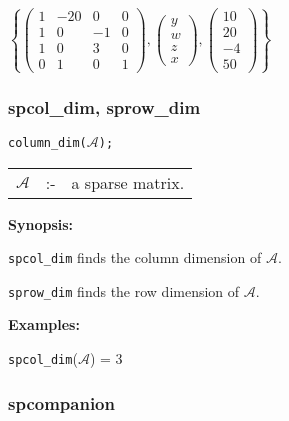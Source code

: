 \vspace*{0.1in}

\begin{flushleft}
\hspace*{0.175in}
\begin{math}  
\left\{ \left( \begin{array}{cccc} 1 & -20 & 0 & 0 \\ 1 & 0 & -1 & 0 \\
 1 & 0 & 3 & 0 \\ 0 & 1 & 0 & 1 
\end{array} \right), \left( \begin{array}{c} y \\ w \\ z \\ x \end{array} 
\right), \left( \begin{array}{c} 10 \\ 20 \\ -4 \\ 50
\end{array} \right) \right\} 
\end{math}  
\end{flushleft}

\subsubsection{spcol\_dim, sprow\_dim}

\hspace*{0.175in} \texttt{column\_dim($\mathcal{A}$);}

\hspace*{0.1in} 
\begin{tabular}{l l l}
$\mathcal{A}$ &:-& a sparse matrix.
\end{tabular}

\textbf{Synopsis:} 

\hspace*{0.175in} \texttt{spcol\_dim} finds the column dimension of 
                $\mathcal{A}$. 

\hspace*{0.175in} \texttt{sprow\_dim} finds the row dimension of $\mathcal{A}$.

\textbf{Examples:}

\hspace*{0.175in}
\texttt{spcol\_dim}($\mathcal{A}$) = 3

\subsubsection{spcompanion}

